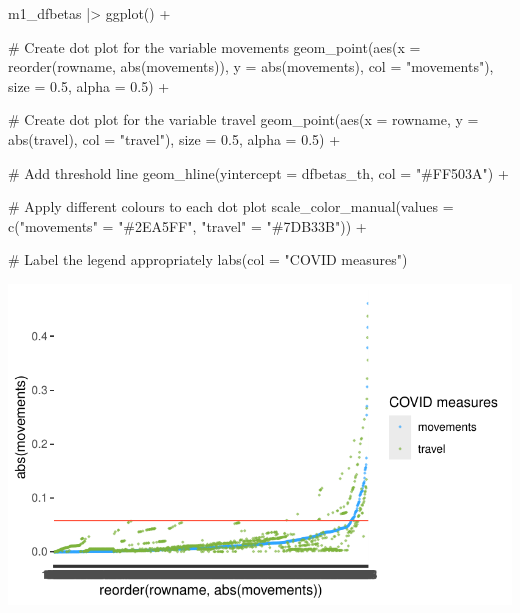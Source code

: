 \documentclass[
  letterpaper,
  DIV=11,
  numbers=noendperiod]{scrreprt}
\newenvironment{Shaded}{\begin{snugshade}}{\end{snugshade}}
\newcommand{\AttributeTok}[1]{\textcolor[rgb]{0.40,0.45,0.13}{#1}}
\newcommand{\CommentTok}[1]{\textcolor[rgb]{0.37,0.37,0.37}{#1}}
\newcommand{\FloatTok}[1]{\textcolor[rgb]{0.68,0.00,0.00}{#1}}
\newcommand{\FunctionTok}[1]{\textcolor[rgb]{0.28,0.35,0.67}{#1}}
\newcommand{\NormalTok}[1]{\textcolor[rgb]{0.00,0.23,0.31}{#1}}
\newcommand{\OtherTok}[1]{\textcolor[rgb]{0.00,0.23,0.31}{#1}}
\newcommand{\SpecialCharTok}[1]{\textcolor[rgb]{0.37,0.37,0.37}{#1}}
\newcommand{\StringTok}[1]{\textcolor[rgb]{0.13,0.47,0.30}{#1}}
\begin{document}
\begin{Shaded}
\begin{Highlighting}[]
\NormalTok{m1\_dfbetas }\SpecialCharTok{|\textgreater{}}
  \FunctionTok{ggplot}\NormalTok{() }\SpecialCharTok{+}
  
  \CommentTok{\# Create dot plot for the variable movements}
  \FunctionTok{geom\_point}\NormalTok{(}\FunctionTok{aes}\NormalTok{(}\AttributeTok{x =} \FunctionTok{reorder}\NormalTok{(rowname, }\FunctionTok{abs}\NormalTok{(movements)),}
                 \AttributeTok{y =} \FunctionTok{abs}\NormalTok{(movements),}
                 \AttributeTok{col =} \StringTok{"movements"}\NormalTok{),}
             \AttributeTok{size =} \FloatTok{0.5}\NormalTok{,}
             \AttributeTok{alpha =} \FloatTok{0.5}\NormalTok{) }\SpecialCharTok{+}
  
  \CommentTok{\# Create dot plot for the variable travel}
  \FunctionTok{geom\_point}\NormalTok{(}\FunctionTok{aes}\NormalTok{(}\AttributeTok{x =}\NormalTok{ rowname,}
                 \AttributeTok{y =} \FunctionTok{abs}\NormalTok{(travel),}
                 \AttributeTok{col =} \StringTok{"travel"}\NormalTok{),}
             \AttributeTok{size =} \FloatTok{0.5}\NormalTok{,}
             \AttributeTok{alpha =} \FloatTok{0.5}\NormalTok{) }\SpecialCharTok{+}
  
  \CommentTok{\# Add threshold line}
  \FunctionTok{geom\_hline}\NormalTok{(}\AttributeTok{yintercept =}\NormalTok{ dfbetas\_th, }\AttributeTok{col =} \StringTok{"\#FF503A"}\NormalTok{) }\SpecialCharTok{+}
  
  \CommentTok{\# Apply different colours to each dot plot}
  \FunctionTok{scale\_color\_manual}\NormalTok{(}\AttributeTok{values =} \FunctionTok{c}\NormalTok{(}\StringTok{"movements"} \OtherTok{=} \StringTok{"\#2EA5FF"}\NormalTok{,}
                                \StringTok{"travel"} \OtherTok{=} \StringTok{"\#7DB33B"}\NormalTok{)) }\SpecialCharTok{+}

  \CommentTok{\# Label the legend appropriately}
  \FunctionTok{labs}\NormalTok{(}\AttributeTok{col =} \StringTok{"COVID measures"}\NormalTok{)}
\end{Highlighting}
\end{Shaded}

\includegraphics{13_regressions_files/figure-latex/dfbetas-plot-outliers-alternative-1.pdf}
\end{document}
